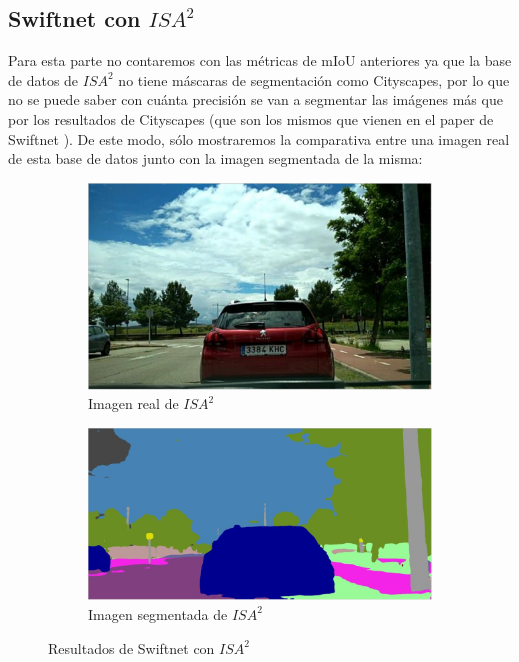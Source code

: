 \subsection{Swiftnet con $ISA^{2}$}

Para esta parte no contaremos con las métricas de \ac{mIoU} anteriores ya que la base de datos de $ISA^{2}$ no tiene máscaras de segmentación como Cityscapes, por lo que no se puede saber con cuánta precisión se van a segmentar las imágenes más que por los resultados de Cityscapes (que son los mismos que vienen en el paper de Swiftnet \cite{swiftnet}). De este modo, sólo mostraremos la comparativa entre una imagen real de esta base de datos junto con la imagen segmentada de la misma:

\begin{figure}[H]
\centering
  \begin{subfigure}[b]{0.45\linewidth}
    \includegraphics[width=\linewidth]{Figuras/Imagen_ISA2_Real.eps}
    \caption{Imagen real de $ISA^{2}$}
  \end{subfigure}
    \begin{subfigure}[b]{0.45\linewidth}
    \includegraphics[width=\linewidth]{Figuras/Imagen_ISA2_Segmentada.eps}
    \caption{Imagen segmentada de $ISA^{2}$}
  \end{subfigure}
  \caption{Resultados de Swiftnet con $ISA^{2}$}
\end{figure}

